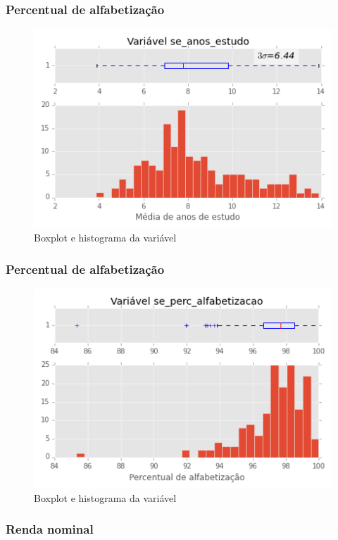 \subsubsection{Percentual de alfabetização}

\begin{figure}[H]
	\centering
	\includegraphics[width=0.8\linewidth]{img/var_se_anos_estudo_boxhist}
	\caption{Boxplot e histograma da variável }
	\label{fig:var_se_anos_estudo_boxhist}
\end{figure} 

\subsubsection{Percentual de alfabetização}

\begin{figure}[H]
	\centering
	\includegraphics[width=0.8\linewidth]{img/var_se_perc_alfabetizacao_boxhist}
	\caption{Boxplot e histograma da variável }
	\label{fig:var_se_perc_alfabetizacao_boxhist}
\end{figure} 

\subsubsection{Renda nominal}

